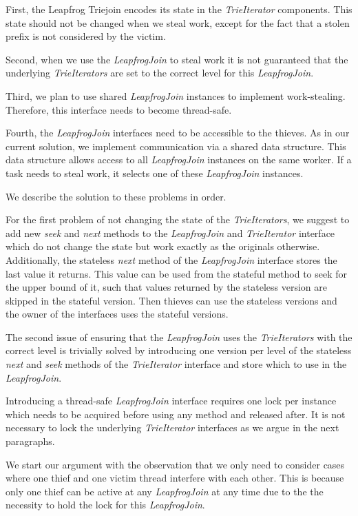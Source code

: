 First, the Leapfrog Triejoin encodes its state in the \textit{TrieIterator} components.
This state should not be changed when we steal work, except for the fact that a stolen
prefix is not considered by the victim.

Second, when we use the \textit{LeapfrogJoin} to steal work it is not guaranteed that the underlying
\textit{TrieIterators} are set to the correct level for this \textit{LeapfrogJoin}.

Third, we plan to use shared \textit{LeapfrogJoin} instances to implement work-stealing.
Therefore, this interface needs to become thread-safe.

Fourth, the \textit{LeapfrogJoin} interfaces need to be accessible to the thieves.
As in our current solution, we implement communication via a shared data structure.
This data structure allows access to all \textit{LeapfrogJoin} instances on the same worker.
If a task needs to steal work, it selects one of these \textit{LeapfrogJoin} instances.

We describe the solution to these problems in order.

For the first problem of not changing the state of the \textit{TrieIterators}, we
suggest to add new \textit{seek} and \textit{next} methods to the \textit{LeapfrogJoin} and
\textit{TrieIterator} interface which do not change the state but work exactly as the originals
otherwise.
Additionally, the stateless \textit{next} method of the \textit{LeapfrogJoin} interface stores
the last value it returns.
This value can be used from the stateful method to seek for the upper bound of it, such that
values returned by the stateless version are skipped in the stateful version.
Then thieves can use the stateless versions and the owner of the interfaces uses the stateful
versions.

The second issue of ensuring that the \textit{LeapfrogJoin} uses the \textit{TrieIterators} with
the correct level is trivially solved by introducing one version per level of the stateless \textit{next}
and \textit{seek} methods of the \textit{TrieIterator} interface and store which to use in the
\textit{LeapfrogJoin}.

Introducing a thread-safe \textit{LeapfrogJoin} interface requires one lock per instance which
needs to be acquired before using any method and released after.
It is not necessary to lock the underlying \textit{TrieIterator} interfaces as we argue in the next
paragraphs.

We start our argument with the observation that we only need to consider cases where one thief and one victim
thread interfere with each other.
This is because only one thief can be active at any \textit{LeapfrogJoin} at any time due to the
the necessity to hold the lock for this \textit{LeapfrogJoin}.

